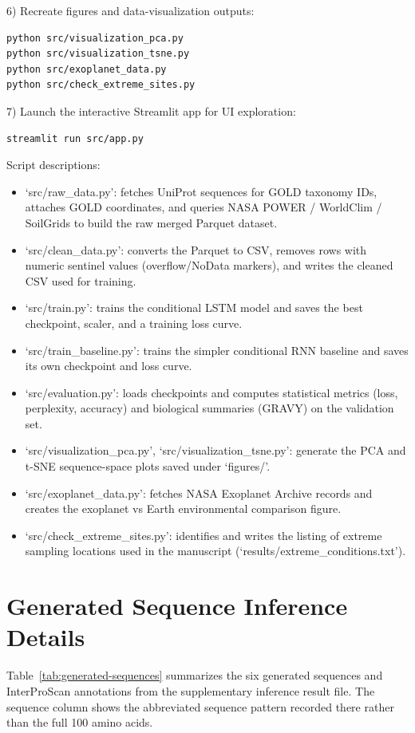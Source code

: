 \documentclass[11pt]{article}
\begin{document}
6) Recreate figures and data-visualization outputs:
\begin{verbatim}
python src/visualization_pca.py
python src/visualization_tsne.py
python src/exoplanet_data.py
python src/check_extreme_sites.py
\end{verbatim}
7) Launch the interactive Streamlit app for UI exploration:
\begin{verbatim}
streamlit run src/app.py
\end{verbatim}

Script descriptions:
\begin{itemize}
  \item `src/raw\_data.py': fetches UniProt sequences for GOLD taxonomy IDs, attaches GOLD
  coordinates, and queries NASA POWER / WorldClim / SoilGrids to build the
  raw merged Parquet dataset.
  \item `src/clean\_data.py': converts the Parquet to CSV, removes rows with numeric
  sentinel values (overflow/NoData markers), and writes the cleaned CSV used
  for training.
  \item `src/train.py': trains the conditional LSTM model and saves the best
  checkpoint, scaler, and a training loss curve.
  \item `src/train\_baseline.py': trains the simpler conditional RNN baseline and
  saves its own checkpoint and loss curve.
  \item `src/evaluation.py': loads checkpoints and computes statistical metrics
  (loss, perplexity, accuracy) and biological summaries (GRAVY) on the
  validation set.
  \item `src/visualization\_pca.py', `src/visualization\_tsne.py': generate the PCA
  and t-SNE sequence-space plots saved under `figures/'.
  \item `src/exoplanet\_data.py': fetches NASA Exoplanet Archive records and
  creates the exoplanet vs Earth environmental comparison figure.
  \item `src/check\_extreme\_sites.py': identifies and writes the listing of extreme
  sampling locations used in the manuscript (`results/extreme\_conditions.txt').

\end{itemize}

\section{Generated Sequence Inference Details}
\label{app:generated}
Table~\ref{tab:generated-sequences} summarizes the six generated sequences and
InterProScan annotations from the supplementary inference result file. The
sequence column shows the abbreviated sequence pattern recorded there rather
than the full 100 amino acids.
\end{document}
